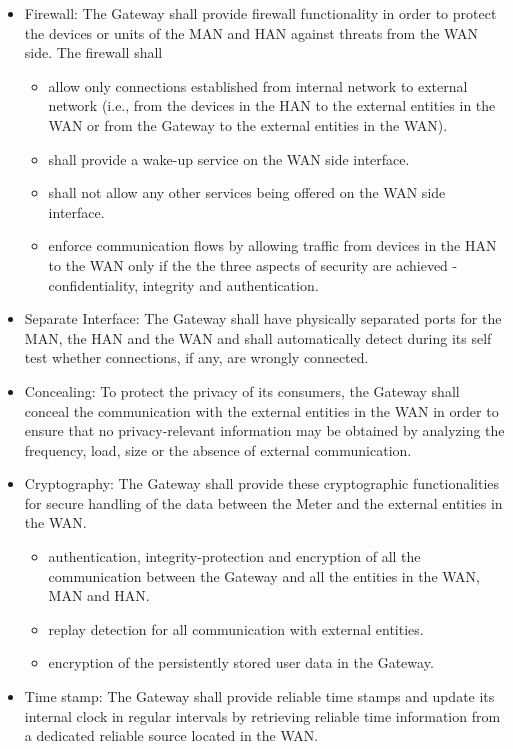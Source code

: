 \begin{itemize}
\item Firewall: The Gateway shall provide firewall functionality in order to protect the devices or units of the MAN and HAN against threats from the WAN side. The firewall shall
\begin{itemize}
\item allow only connections established from internal network to external network (i.e., from the devices in the HAN to the external entities in the WAN or from the Gateway to the external entities in the WAN).
\item shall provide a wake-up service on the WAN side interface.
\item shall not allow any other services being offered on the WAN side interface.
\item enforce communication flows by allowing traffic from devices in the HAN to the WAN only if the the three aspects of security are achieved - confidentiality, integrity and authentication.
\end{itemize}
\item Separate Interface: The Gateway shall have physically separated ports for the MAN, the HAN and the WAN and shall automatically detect during its self test whether connections, if any, are wrongly connected.
\item Concealing: To protect the privacy of its consumers, the Gateway shall conceal the communication with the external entities in the WAN in order to ensure that no privacy-relevant information may be obtained by analyzing the frequency, load, size or the absence of external communication.
\item Cryptography: The Gateway shall provide these cryptographic functionalities for secure handling of the data between the Meter and the external entities in the WAN.
\begin{itemize}
\item authentication, integrity-protection and encryption of all the communication between the Gateway and all the entities in the WAN, MAN and HAN.
\item replay detection for all communication with external entities.
\item encryption of the persistently stored user data in the Gateway.
\end{itemize}
\item Time stamp: The Gateway shall provide reliable time stamps and update its internal clock in regular intervals by retrieving reliable time information from a dedicated reliable source located in the WAN.

\end{itemize}
